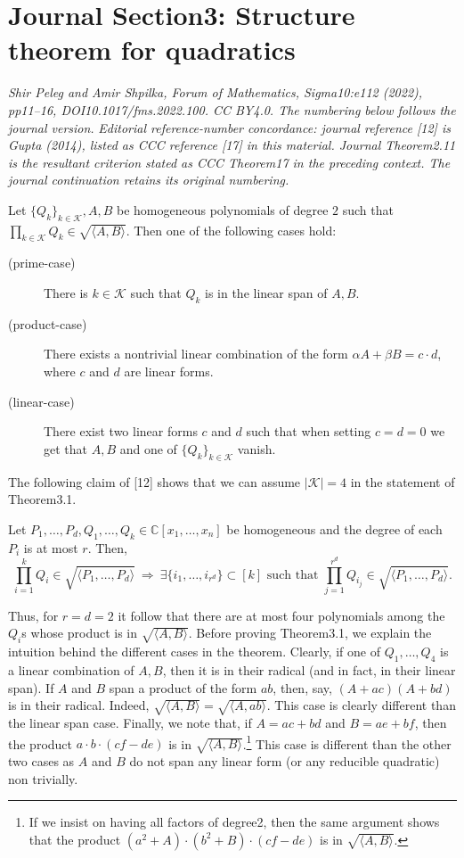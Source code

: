 \section*{Journal Section3: Structure theorem for quadratics}
\textit{Shir Peleg and Amir Shpilka, Forum of Mathematics, Sigma10:e112 (2022), pp11--16, DOI10.1017/fms.2022.100. CC BY4.0. The numbering below follows the journal version.}
\noindent\textit{Editorial reference-number concordance: journal reference [12] is Gupta (2014), listed as CCC reference [17] in this material. Journal Theorem2.11 is the resultant criterion stated as CCC Theorem17 in the preceding context. The journal continuation retains its original numbering.}
\begin{nttheorem}
Let $\{Q_k\}_{k\in\mathcal K},A,B$ be homogeneous polynomials of degree $2$ such that $\prod_{k\in\mathcal K}Q_k\in\sqrt{\langle A,B\rangle}$. Then one of the following cases hold:
\begin{description}
\item[(prime-case)] There is $k\in\mathcal K$ such that $Q_k$ is in the linear span of $A,B$.
\item[(product-case)] There exists a nontrivial linear combination of the form $\alpha A+\beta B=c\cdot d$, where $c$ and $d$ are linear forms.
\item[(linear-case)] There exist two linear forms $c$ and $d$ such that when setting $c=d=0$ we get that $A,B$ and one of $\{Q_k\}_{k\in\mathcal K}$ vanish.
\end{description}
\end{nttheorem}
The following claim of [12] shows that we can assume $|\mathcal K|=4$ in the statement of Theorem3.1.
\begin{ntclaim}
Let $P_1,\ldots,P_d,Q_1,\ldots,Q_k\in\mathbb C[x_1,\ldots,x_n]$ be homogeneous and the degree of each $P_i$ is at most $r$. Then,
\[\prod_{i=1}^kQ_i\in\sqrt{\langle P_1,\ldots,P_d\rangle}\ \Rightarrow\ \exists\{i_1,\ldots,i_{r^d}\}\subset[k]\text{ such that }\prod_{j=1}^{r^d}Q_{i_j}\in\sqrt{\langle P_1,\ldots,P_d\rangle}.\]
\end{ntclaim}
Thus, for $r=d=2$ it follow that there are at most four polynomials among the $Q_i$s whose product is in $\sqrt{\langle A,B\rangle}$.
Before proving Theorem3.1, we explain the intuition behind the different cases in the theorem. Clearly, if one of $Q_1,\ldots,Q_4$ is a linear combination of $A,B$, then it is in their radical (and in fact, in their linear span). If $A$ and $B$ span a product of the form $ab$, then, say, $(A+ac)(A+bd)$ is in their radical. Indeed, $\sqrt{\langle A,B\rangle}=\sqrt{\langle A,ab\rangle}$. This case is clearly different than the linear span case. Finally, we note that, if $A=ac+bd$ and $B=ae+bf$, then the product $a\cdot b\cdot(cf-de)$ is in $\sqrt{\langle A,B\rangle}$.\footnote{If we insist on having all factors of degree2, then the same argument shows that the product $(a^2+A)\cdot(b^2+B)\cdot(cf-de)$ is in $\sqrt{\langle A,B\rangle}$.} This case is different than the other two cases as $A$ and $B$ do not span any linear form (or any reducible quadratic) non trivially.
